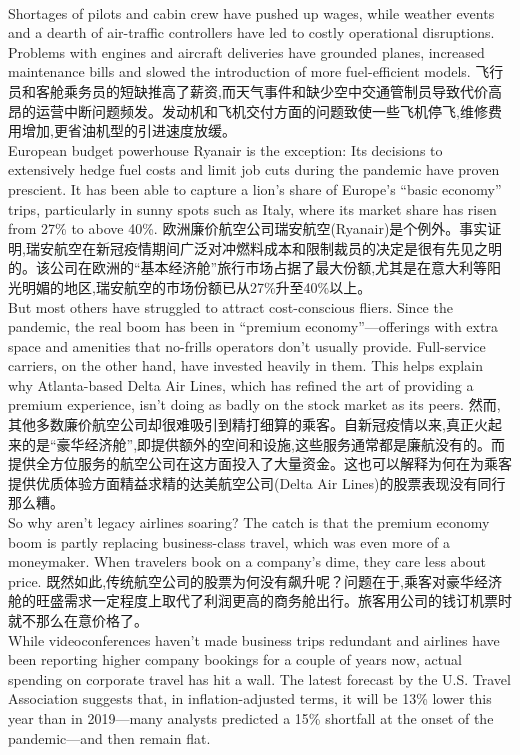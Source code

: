 \documentclass[a4paper,12pt]{article}
\begin{document}
\\Shortages of pilots and cabin crew have pushed up wages, while weather events and a dearth of air-traffic controllers have led to costly operational disruptions. Problems with engines and aircraft deliveries have grounded planes, increased maintenance bills and slowed the introduction of more fuel-efficient models.
飞行员和客舱乘务员的短缺推高了薪资,而天气事件和缺少空中交通管制员导致代价高昂的运营中断问题频发。发动机和飞机交付方面的问题致使一些飞机停飞,维修费用增加,更省油机型的引进速度放缓。
\\European budget powerhouse Ryanair is the exception: Its decisions to extensively hedge fuel costs and limit job cuts during the pandemic have proven prescient. It has been able to capture a lion's share of Europe's “basic economy” trips, particularly in sunny spots such as Italy, where its market share has risen from 27\% to above 40\%.
欧洲廉价航空公司瑞安航空(Ryanair)是个例外。事实证明,瑞安航空在新冠疫情期间广泛对冲燃料成本和限制裁员的决定是很有先见之明的。该公司在欧洲的“基本经济舱”旅行市场占据了最大份额,尤其是在意大利等阳光明媚的地区,瑞安航空的市场份额已从27\%升至40\%以上。
\\But most others have struggled to attract cost-conscious fliers. Since the pandemic, the real boom has been in “premium economy”—offerings with extra space and amenities that no-frills operators don't usually provide. Full-service carriers, on the other hand, have invested heavily in them. This helps explain why Atlanta-based Delta Air Lines, which has refined the art of providing a premium experience, isn't doing as badly on the stock market as its peers.
然而,其他多数廉价航空公司却很难吸引到精打细算的乘客。自新冠疫情以来,真正火起来的是“豪华经济舱”,即提供额外的空间和设施,这些服务通常都是廉航没有的。而提供全方位服务的航空公司在这方面投入了大量资金。这也可以解释为何在为乘客提供优质体验方面精益求精的达美航空公司(Delta Air Lines)的股票表现没有同行那么糟。
\\So why aren't legacy airlines soaring? The catch is that the premium economy boom is partly replacing business-class travel, which was even more of a moneymaker. When travelers book on a company's dime, they care less about price.
既然如此,传统航空公司的股票为何没有飙升呢？问题在于,乘客对豪华经济舱的旺盛需求一定程度上取代了利润更高的商务舱出行。旅客用公司的钱订机票时就不那么在意价格了。
\\While videoconferences haven't made business trips redundant and airlines have been reporting higher company bookings for a couple of years now, actual spending on corporate travel has hit a wall. The latest forecast by the U.S. Travel Association suggests that, in inflation-adjusted terms, it will be 13\% lower this year than in 2019—many analysts predicted a 15\% shortfall at the onset of the pandemic—and then remain flat.
\end{document}
